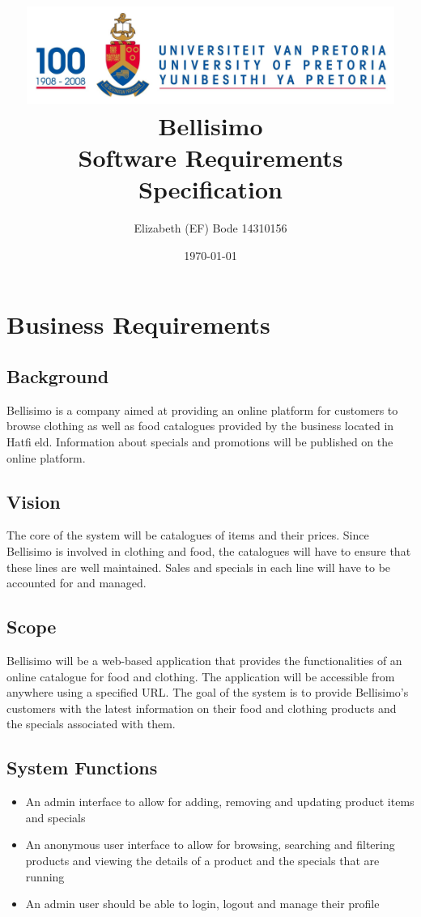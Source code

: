 \documentclass[a4paper,10pt]{article}
\title{\includegraphics[width=12cm]{Eeufeeslogo.jpg} \\      
	\vspace{3.0cm} 
      \bfseries Bellisimo \\
       \vspace{1.0cm}
       Software Requirements Specification \\ 
       \vspace{0.5cm}
       }
\date{\today}
\author{Elizabeth (EF) Bode			14310156}
\begin{document}
\maketitle
\thispagestyle{empty}

\newpage
{}
\thispagestyle{empty}
\tableofcontents
\clearpage

\newpage
{}

\section{Business Requirements}
\subsection{Background}
Bellisimo is a company aimed at providing an online platform for customers to browse clothing as well as food catalogues provided by the business located in Hatfield. Information about specials and promotions will be published on the online platform.

\subsection{Vision}
The core of the system will be catalogues of items and their prices. Since Bellisimo is involved in clothing and food, the catalogues will have to ensure that these lines are well maintained. Sales and specials in each line will have to be accounted for and managed.

\subsection{Scope}
Bellisimo will be a web-based application that provides the functionalities of an online catalogue for food and clothing. The application will be accessible from anywhere using a specified URL. The goal of the system is to provide Bellisimo’s customers with the latest information on their food and clothing products and the specials associated with them.

\subsection{System Functions}
\begin{itemize}
	\item An admin interface to allow for adding, removing and updating product items and specials
	\item An anonymous user interface to allow for browsing, searching and filtering products and viewing the details of a product and the specials that are running
	\item An admin user should be able to login, logout and manage their profile
\end{itemize}
\end{document}
